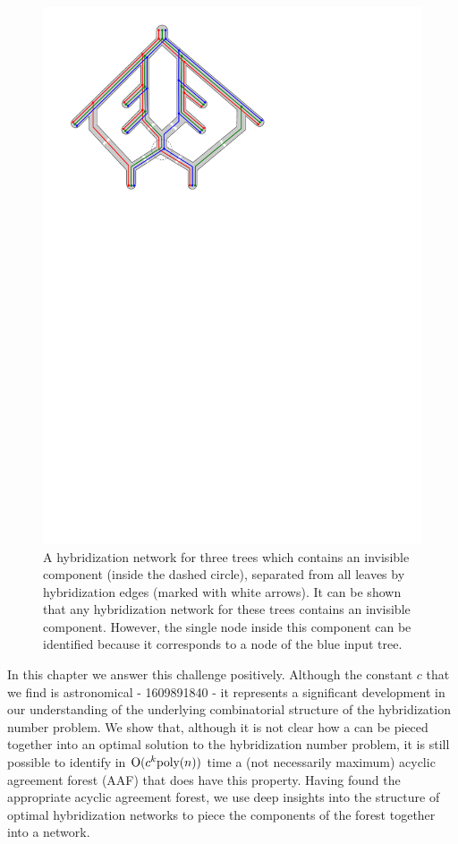   \begin{figure}[t]
    \centering
    \includegraphics{../figs/ch4/invisible-node-example}
    \caption{A hybridization network for three trees which contains an invisible component (inside the dashed circle), separated from all leaves by hybridization edges (marked with white arrows).   
    It can be shown that any hybridization network for these trees contains an invisible component. However, the single node inside this component can be identified because it corresponds to a node of the blue input tree.}
    \label{fig:invisible}
  \end{figure}

In this chapter we answer this challenge positively. Although the constant $c$ that we find is astronomical  - 1609891840 - it represents a significant development in our understanding of the underlying combinatorial structure of the hybridization number problem. We show that, although it is not clear how a \maaf can be pieced together into an optimal solution to the hybridization number problem, it is still possible to identify in $\mathrm{O}(c^k \text{poly}(n))$ time a (not necessarily maximum) acyclic agreement forest (AAF) that does have this property. Having found the appropriate acyclic agreement forest, we use deep insights into the structure of optimal hybridization networks to piece the components of the forest together into a network. 

